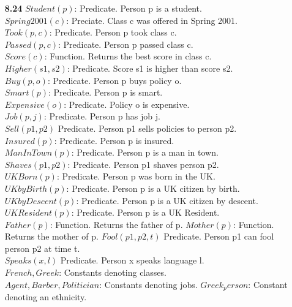 \documentclass{article}
\begin{document}
\begin{enumerate}
\item[\textbf{8.24}]
$Student(p)$: Predicate. Person p is a student.\\
$Spring2001(c)$: Preciate. Class c was offered in Spring 2001.\\
$Took(p, c)$: Predicate. Person p took class c.\\
$Passed(p, c)$: Predicate. Person p passed class c.\\
$Score(c)$: Function. Returns the best score in class c.\\
$Higher(s1, s2)$: Predicate. Score s1 is higher than score s2.\\
$Buy(p, o)$: Predicate. Person p buys policy o.\\
$Smart(p)$: Predicate. Person p is smart.\\
$Expensive(o)$: Predicate. Policy o is expensive.\\
$Job(p, j)$: Predicate. Person p has job j.\\
$Sell(p1, p2)$ Predicate. Person p1 sells policies to person p2.\\
$Insured(p)$: Predicate. Person p is insured.\\
$ManInTown(p)$: Predicate. Person p is a man in town.\\
$Shaves(p1, p2)$: Predicate. Person p1 shaves person p2.\\
$UKBorn(p)$: Predicate. Person p was born in the UK.\\
$UKbyBirth(p)$: Predicate. Person p is a UK citizen by birth.\\
$UKbyDescent(p)$: Predicate. Person p is a UK citizen by descent.\\
$UKResident(p)$: Predicate. Person p is a UK Resident.\\
$Father(p)$: Function. Returns the father of p.
$Mother(p)$: Function. Returns the mother of p.
$Fool(p1,p2,t)$ Predicate. Person p1 can fool person p2 at time t.\\
$Speaks(x,l)$ Predicate. Person x speaks language l.\\
$French, Greek$: Constants denoting classes.\\
$Agent, Barber, Politician$: Constants denoting jobs.
$Greek_person$: Constant denoting an ethnicity.\\


\end{enumerate}
\end{document}
